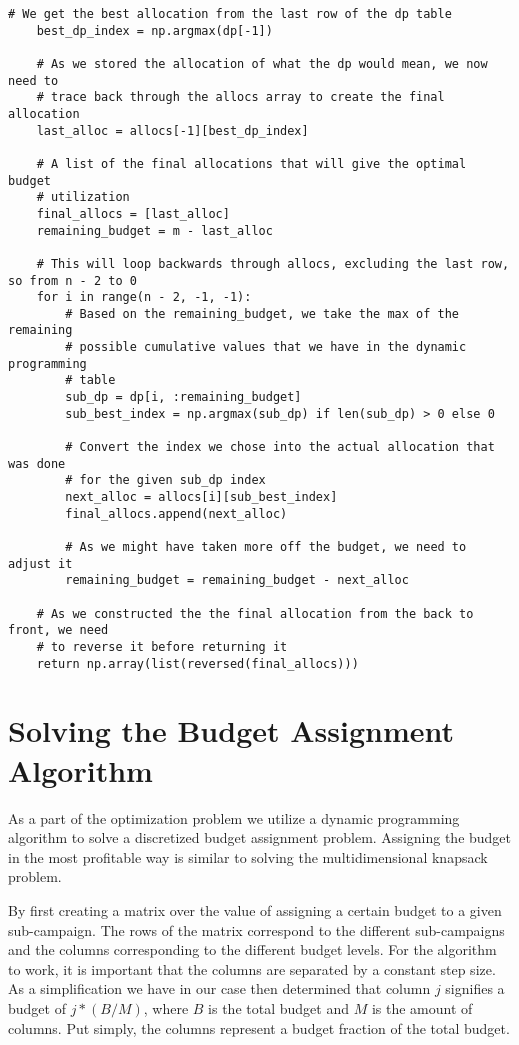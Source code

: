 \begin{lstlisting}[style=Python]
    # We get the best allocation from the last row of the dp table
    best_dp_index = np.argmax(dp[-1])

    # As we stored the allocation of what the dp would mean, we now need to
    # trace back through the allocs array to create the final allocation
    last_alloc = allocs[-1][best_dp_index]

    # A list of the final allocations that will give the optimal budget
    # utilization
    final_allocs = [last_alloc]
    remaining_budget = m - last_alloc

    # This will loop backwards through allocs, excluding the last row, so from n - 2 to 0
    for i in range(n - 2, -1, -1):
        # Based on the remaining_budget, we take the max of the remaining
        # possible cumulative values that we have in the dynamic programming
        # table
        sub_dp = dp[i, :remaining_budget]
        sub_best_index = np.argmax(sub_dp) if len(sub_dp) > 0 else 0

        # Convert the index we chose into the actual allocation that was done
        # for the given sub_dp index
        next_alloc = allocs[i][sub_best_index]
        final_allocs.append(next_alloc)

        # As we might have taken more off the budget, we need to adjust it
        remaining_budget = remaining_budget - next_alloc

    # As we constructed the the final allocation from the back to front, we need
    # to reverse it before returning it
    return np.array(list(reversed(final_allocs)))
\end{lstlisting}

\section{Solving the Budget Assignment Algorithm}
\label{sec:budget_assignment_algorithm}

As a part of the optimization problem we utilize a dynamic programming algorithm to solve a discretized budget assignment problem. Assigning the budget in the most profitable way is similar to solving the multidimensional knapsack problem.

By first creating a matrix over the value of assigning a certain budget to a given sub-campaign. The rows of the matrix correspond to the different sub-campaigns and the columns corresponding to the different budget levels. For the algorithm to work, it is important that the columns are separated by a constant step size. As a simplification we have in our case then determined that column $j$ signifies a budget of $j * (B / M)$, where $B$ is the total budget and $M$ is the amount of columns. Put simply, the columns represent a budget fraction of the total budget.

